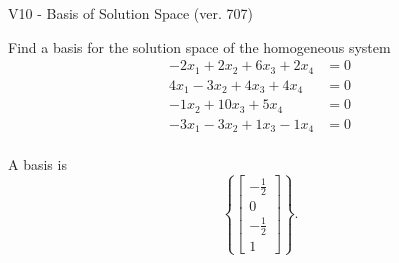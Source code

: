 \begin{exercise}
  \begin{exerciseTitle}V10 - Basis of Solution Space (ver. 707)\end{exerciseTitle}
  \begin{exerciseStatement}
    Find a basis for the solution space of the homogeneous system 
\begin{align*}
 -2 x_ 1 + 2 x_ 2 + 6 x_ 3 + 2 x_ 4 &= 0  \\ 
  4 x_ 1 -3 x_ 2 + 4 x_ 3 + 4 x_ 4 &= 0  \\ 
  -1 x_ 2 + 10 x_ 3 + 5 x_ 4 &= 0  \\ 
  -3 x_ 1 -3 x_ 2 + 1 x_ 3 -1 x_ 4 &= 0  \\ 
 \end{align*}


 
  \end{exerciseStatement}

  \begin{exerciseAnswer}
   A basis is   
\[\left\{\left[\begin{array}{c}
-\frac{1}{2} \\
0 \\
-\frac{1}{2} \\
1
\end{array}\right]\right\}.\]

  


  \end{exerciseAnswer}
\end{exercise}